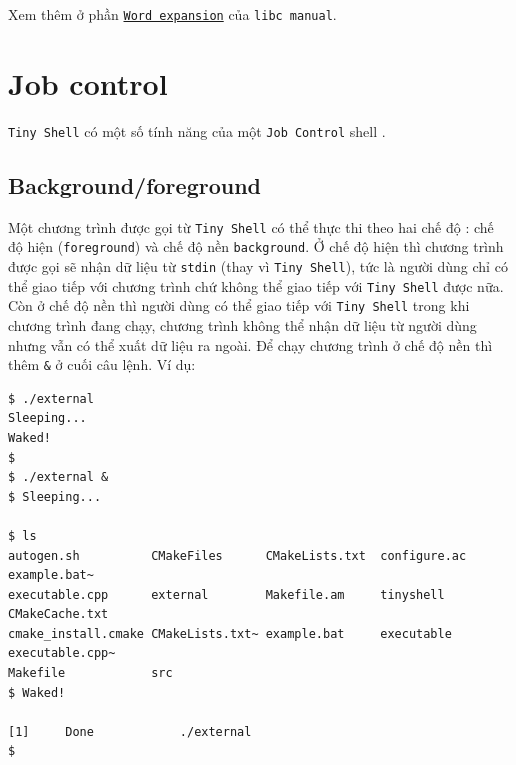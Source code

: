 \documentclass[a4paper,12pt]{report}
\begin{document}
    Xem thêm ở phần \href{http://www.gnu.org/software/libc/manual/html_node/Word-Expansion.html#Word-Expansion}{\texttt{Word expansion}} của \texttt{libc manual}.\\

    \section{Job control}
    \label{sec:jobcontrol}
    \texttt{Tiny Shell} có một số tính năng của một \texttt{Job Control}
    shell \citep{LCJC}.
        \subsection{Background/foreground}
	    Một chương trình được gọi từ \texttt{Tiny Shell} có thể thực thi
	    theo hai chế độ : chế độ hiện (\texttt{foreground}) và chế độ nền
	    \texttt{background}. Ở chế độ hiện thì chương trình được gọi sẽ
	    nhận dữ liệu từ \texttt{stdin} (thay vì \texttt{Tiny Shell}), tức
	    là người dùng chỉ có thể giao tiếp với chương trình chứ không thể
	    giao tiếp với \texttt{Tiny Shell} được nữa. Còn ở chế độ nền thì
	    người dùng có thể giao tiếp với \texttt{Tiny Shell} trong khi
	    chương trình đang chạy, chương trình không thể nhận dữ liệu từ
	    người dùng nhưng vẫn có thể xuất dữ liệu ra ngoài. Để chạy chương
	    trình ở chế độ nền thì thêm \texttt{\&} ở cuối câu lệnh. Ví dụ:
	
	    \begin{verbatim}
$ ./external 
Sleeping...
Waked!
$ 
$ ./external &
$ Sleeping...

$ ls
autogen.sh          CMakeFiles      CMakeLists.txt  configure.ac    example.bat~  
executable.cpp      external        Makefile.am     tinyshell       CMakeCache.txt  
cmake_install.cmake CMakeLists.txt~ example.bat     executable      executable.cpp~  
Makefile            src
$ Waked!

[1]     Done            ./external 
$ 
	    \end{verbatim}
	
\end{document}
